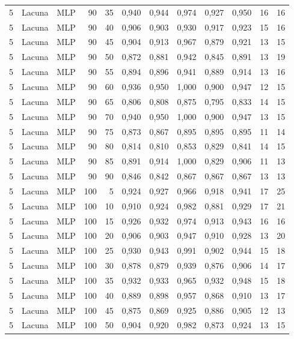 \begin{longtable}{@{}rllrrrrrrrrr@{}}
5 & Lacuna & MLP & 90 & 35 & 0,940 & 0,944 & 0,974 & 0,927 & 0,950 & 16 & 16 \\
5 & Lacuna & MLP & 90 & 40 & 0,906 & 0,903 & 0,930 & 0,917 & 0,923 & 15 & 16 \\
5 & Lacuna & MLP & 90 & 45 & 0,904 & 0,913 & 0,967 & 0,879 & 0,921 & 13 & 15 \\
5 & Lacuna & MLP & 90 & 50 & 0,872 & 0,881 & 0,942 & 0,845 & 0,891 & 13 & 19 \\
5 & Lacuna & MLP & 90 & 55 & 0,894 & 0,896 & 0,941 & 0,889 & 0,914 & 13 & 16 \\
5 & Lacuna & MLP & 90 & 60 & 0,936 & 0,950 & 1,000 & 0,900 & 0,947 & 12 & 15 \\
5 & Lacuna & MLP & 90 & 65 & 0,806 & 0,808 & 0,875 & 0,795 & 0,833 & 14 & 15 \\
5 & Lacuna & MLP & 90 & 70 & 0,940 & 0,950 & 1,000 & 0,900 & 0,947 & 13 & 15 \\
5 & Lacuna & MLP & 90 & 75 & 0,873 & 0,867 & 0,895 & 0,895 & 0,895 & 11 & 14 \\
5 & Lacuna & MLP & 90 & 80 & 0,814 & 0,810 & 0,853 & 0,829 & 0,841 & 14 & 15 \\
5 & Lacuna & MLP & 90 & 85 & 0,891 & 0,914 & 1,000 & 0,829 & 0,906 & 11 & 13 \\
5 & Lacuna & MLP & 90 & 90 & 0,846 & 0,842 & 0,867 & 0,867 & 0,867 & 13 & 13 \\
5 & Lacuna & MLP & 100 & 5 & 0,924 & 0,927 & 0,966 & 0,918 & 0,941 & 17 & 25 \\
5 & Lacuna & MLP & 100 & 10 & 0,910 & 0,924 & 0,982 & 0,881 & 0,929 & 17 & 21 \\
5 & Lacuna & MLP & 100 & 15 & 0,926 & 0,932 & 0,974 & 0,913 & 0,943 & 16 & 16 \\
5 & Lacuna & MLP & 100 & 20 & 0,906 & 0,903 & 0,947 & 0,910 & 0,928 & 13 & 20 \\
5 & Lacuna & MLP & 100 & 25 & 0,930 & 0,943 & 0,991 & 0,902 & 0,944 & 15 & 18 \\
5 & Lacuna & MLP & 100 & 30 & 0,878 & 0,879 & 0,939 & 0,876 & 0,906 & 14 & 17 \\
5 & Lacuna & MLP & 100 & 35 & 0,932 & 0,933 & 0,965 & 0,932 & 0,948 & 15 & 18 \\
5 & Lacuna & MLP & 100 & 40 & 0,889 & 0,898 & 0,957 & 0,868 & 0,910 & 13 & 17 \\
5 & Lacuna & MLP & 100 & 45 & 0,875 & 0,869 & 0,925 & 0,886 & 0,905 & 12 & 13 \\
5 & Lacuna & MLP & 100 & 50 & 0,904 & 0,920 & 0,982 & 0,873 & 0,924 & 13 & 15 \\

\end{longtable}
